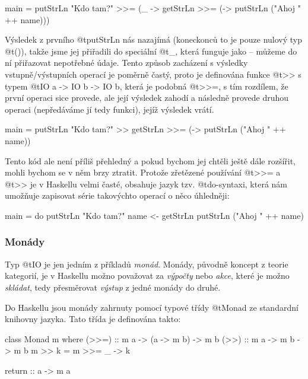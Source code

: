 \begin{haskell}
main = 
  putStrLn "Kdo tam?" >>= (\_ ->
    getStrLn >>= (\name ->
      putStrLn ("Ahoj " ++ name)))
\end{haskell}

Výsledek z prvního @t{putStrLn} nás nazajímá (koneckonců to je pouze nulový typ
@t{()}), takže jsme jej přiřadili do speciální  @t{_}, která
funguje jako  -- můžeme do ní přiřazovat nepotřebné údaje. Tento
způsob zacházení s výsledky vstupně/výstupních operací je poměrně častý, proto
je definována funkce @t{>>} s typem @t{IO a -> IO b -> IO b}, která je podobná
@t{>>=}, s tím rozdílem, že první operaci sice provede, ale její výsledek zahodí
a následně provede druhou operaci (nepředáváme jí tedy funkci), jejíž výsledek
vrátí.

\begin{haskell}
main = 
  putStrLn "Kdo tam?" >>
    getStrLn >>= (\name ->
      putStrLn ("Ahoj " ++ name))
\end{haskell}

Tento kód ale není příliš přehledný a pokud bychom jej chtěli ještě dále
rozšířit, mohli bychom se v něm brzy ztratit. Protože zřetězené používání
@t{>>=} a @t{>>} je v Haskellu velmi časté, obsahuje jazyk tzv. @t{do}-syntaxi,
která nám umožňuje zapisovat série takovýchto operací o něco úhledněji:

\begin{haskell}
main = do
  putStrLn "Kdo tam?"
  name <- getStrLn
  putStrLn ("Ahoj " ++ name)
\end{haskell}

\subsubsection{Monády}

Typ @t{IO} je jen jedním z příkladů \emph{monád}. Monády, původně koncept z
teorie kategorií, je v Haskellu možno považovat za \emph{výpočty} nebo
\emph{akce}, které je možno \emph{skládat}, tedy přesměrovat \emph{výstup} z
jedné monády do druhé.

Do Haskellu jsou monády zahrnuty pomocí typové třídy @t{Monad} ze standardní
knihovny jazyka. Tato třída je definována takto:

\begin{haskell}
class Monad m where
  (>>=)  :: m a -> (a -> m b) -> m b
  (>>)   :: m a -> m b -> m b
  m >> k  = m >>= \_ -> k

  return :: a -> m a
\end{haskell}

